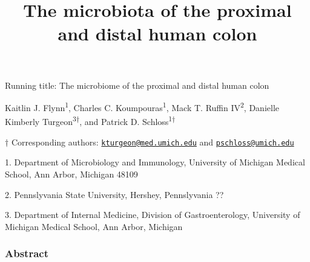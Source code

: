 \documentclass[11pt,]{article}
\title{The microbiota of the proximal and distal human colon}
\author{}
\date{}
\begin{document}
\maketitle

\vspace{35mm}

Running title: The microbiome of the proximal and distal human colon

\vspace{35mm}

Kaitlin J. Flynn\textsuperscript{1}, Charles C.
Koumpouras\textsuperscript{1}, Mack T. Ruffin IV\textsuperscript{2},
Danielle Kimberly Turgeon\textsuperscript{3\(\dagger\)}, and Patrick D.
Schloss\textsuperscript{1\(\dagger\)}

\vspace{35mm}

\(\dagger\) Corresponding authors:
\href{mailto:kturgeon@med.umich.edu}{\nolinkurl{kturgeon@med.umich.edu}}
and \href{mailto:pschloss@umich.edu}{\nolinkurl{pschloss@umich.edu}}

1. Department of Microbiology and Immunology, University of Michigan
Medical School, Ann Arbor, Michigan 48109

2. Pennslyvania State University, Hershey, Pennslyvania ??

3. Department of Internal Medicine, Division of Gastroenterology,
University of Michigan Medical School, Ann Arbor, Michigan

\newpage

\subsubsection{Abstract}\label{abstract}
\end{document}
